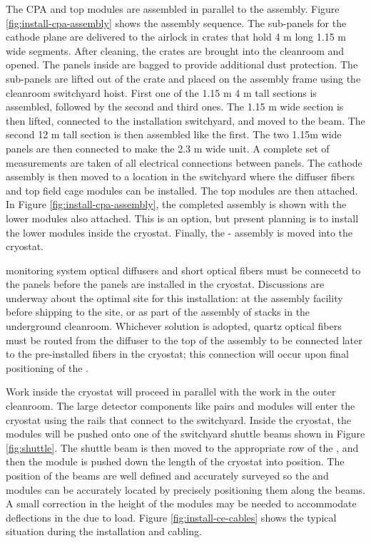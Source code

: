 The CPA and top  modules are assembled in parallel to the  assembly. Figure \ref{fig:install-cpa-assembly} shows the  assembly sequence. The sub-panels for the cathode plane are delivered to the airlock in crates that hold 4 \si{m} long 1.15 \si{m} wide segments. After cleaning, the crates are brought into the cleanroom and opened. The panels inside are bagged to provide additional dust protection. The sub-panels are lifted out of the crate and placed on the assembly frame using the cleanroom switchyard hoist. First one of the 1.15 \si{m} 4 
\si{m} tall sections is assembled, followed by the second and third ones. The 1.15 \si{m} wide section is then lifted, connected to the installation switchyard, and moved to the  beam. The second 12 \si{m} tall section is then assembled like the first. The two 1.15m wide panels are then connected to make the 2.3 \si{m} wide unit.  A complete set of  measurements are taken of all electrical connections between panels.  The cathode assembly  is then moved to a location in the switchyard where the diffuser fibers and top field cage modules can be installed.
 The top  modules are then attached. In Figure \ref{fig:install-cpa-assembly}, the completed assembly is shown with the lower  modules also attached. This is an option, but present planning is to install the lower  modules  inside the cryostat. Finally, the - assembly is moved into the cryostat.


 monitoring system optical diffusers and short optical fibers must be connecetd to the  panels before the panels are installed in the cryostat.  Discussions are underway about the optimal site for this installation:  at the  assembly facility before shipping to the site, or as part of the assembly of  stacks in the underground cleanroom.  Whichever solution is adopted, quartz optical fibers must be routed from the diffuser to the top of the  assembly to be connected later to the pre-installed fibers in the cryostat; this connection will occur upon final positioning of the .  

Work inside the cryostat will proceed in parallel with the work in the outer cleanroom. 
The large detector components like  pairs and  modules will enter the cryostat using the  rails that connect to the  switchyard.
Inside the cryostat, the modules will be pushed onto one of the switchyard shuttle beams shown in  Figure \ref{fig:shuttle}. 
The  shuttle beam is then moved to the appropriate row of the , and then the module is pushed down the length of the cryostat into position. The position of the  beams are well defined and accurately surveyed so the  and  modules can be accurately located by precisely positioning them along the  beams. A small correction in the height of the modules may be needed to accommodate deflections in the  due to load. Figure \ref{fig:install-ce-cables} shows the typical situation during the  installation and  cabling. 

